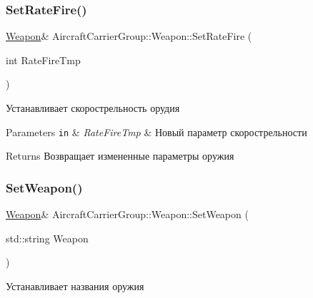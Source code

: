 \subsubsection{\texorpdfstring{Set\+Rate\+Fire()}{SetRateFire()}}
{\footnotesize\ttfamily \mbox{\hyperlink{class_aircraft_carrier_group_1_1_weapon}{Weapon}}\& Aircraft\+Carrier\+Group\+::\+Weapon\+::\+Set\+Rate\+Fire (\begin{DoxyParamCaption}\item[{int}]{Rate\+Fire\+Tmp }\end{DoxyParamCaption})\hspace{0.3cm}{\ttfamily [inline]}}



Устанавливает скорострельность орудия 


\begin{DoxyParams}[1]{Parameters}
\mbox{\tt in}  & {\em Rate\+Fire\+Tmp} & Новый параметр скорострельности \\
\hline
\end{DoxyParams}
\begin{DoxyReturn}{Returns}
Возвращает измененные параметры оружия 
\end{DoxyReturn}
\mbox{\label{class_aircraft_carrier_group_1_1_weapon_a3a73357d6f4f8676192cc10f255e82d2}} 
\subsubsection{\texorpdfstring{Set\+Weapon()}{SetWeapon()}}
{\footnotesize\ttfamily \mbox{\hyperlink{class_aircraft_carrier_group_1_1_weapon}{Weapon}}\& Aircraft\+Carrier\+Group\+::\+Weapon\+::\+Set\+Weapon (\begin{DoxyParamCaption}\item[{std\+::string}]{Weapon }\end{DoxyParamCaption})\hspace{0.3cm}{\ttfamily [inline]}}



Устанавливает названия оружия 


